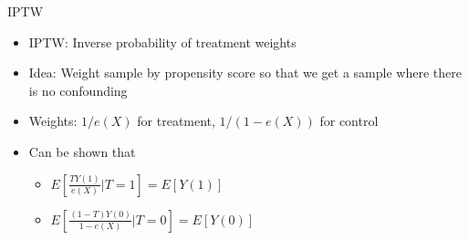 \begin{frame}{IPTW}
\begin{itemize}
\item IPTW: Inverse probability of treatment weights
\item Idea: Weight sample by propensity score so that we get a sample where there is no confounding
\item Weights: $1/e(X)$ for treatment, $1/(1-e(X))$ for control
\item Can be shown that 
\begin{itemize}
 \item $E[\frac{TY(1)}{e(X)}|T=1]=E[Y(1)]$
 \item $E[\frac{(1-T)Y(0)}{1-e(X)}|T=0]=E[Y(0)]$
\end{itemize}
 
\end{itemize}

\end{frame}

